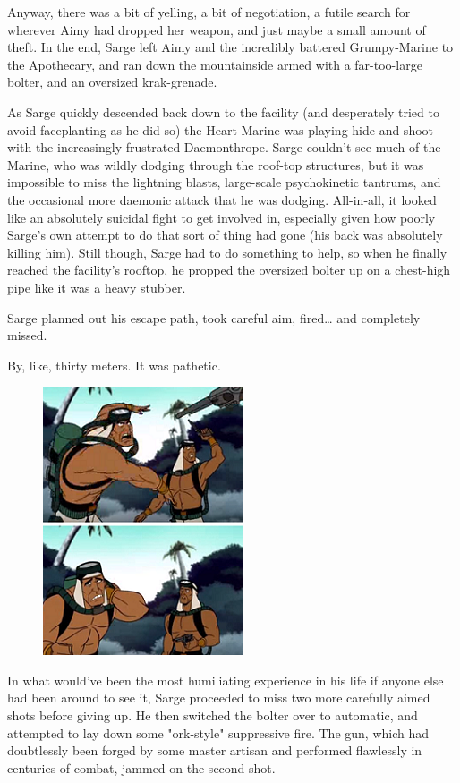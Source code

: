 Anyway, there was a bit of yelling, a bit of negotiation, a futile search for wherever Aimy had dropped her weapon, and just maybe a small amount of theft. 
In the end, Sarge left Aimy and the incredibly battered Grumpy-Marine to the Apothecary, and ran down the mountainside armed with a far-too-large bolter, and an oversized krak-grenade.

As Sarge quickly descended back down to the facility (and desperately tried to avoid faceplanting as he did so) the Heart-Marine was playing hide-and-shoot with the increasingly frustrated Daemonthrope. 
Sarge couldn't see much of the Marine, who was wildly dodging through the roof-top structures, but it was impossible to miss the lightning blasts, large-scale psychokinetic tantrums, and the occasional more daemonic attack that he was dodging. 
All-in-all, it looked like an absolutely suicidal fight to get involved in, especially given how poorly Sarge's own attempt to do that sort of thing had gone (his back was absolutely killing him). 
Still though, Sarge had to do something to help, so when he finally reached the facility's rooftop, he propped the oversized bolter up on a chest-high pipe like it was a heavy stubber.

Sarge planned out his escape path, took careful aim, fired… and completely missed.

By, like, thirty meters. 
It was pathetic.

\begin{figure}
	\begin{center}
		\includegraphics[width=\figwidth]{pics/16/55.png}
	\end{center}
\end{figure}
In what would've been the most humiliating experience in his life if anyone else had been around to see it, Sarge proceeded to miss two more carefully aimed shots before giving up. 
He then switched the bolter over to automatic, and attempted to lay down some "ork-style" suppressive fire. 
The gun, which had doubtlessly been forged by some master artisan and performed flawlessly in centuries of combat, jammed on the second shot.

